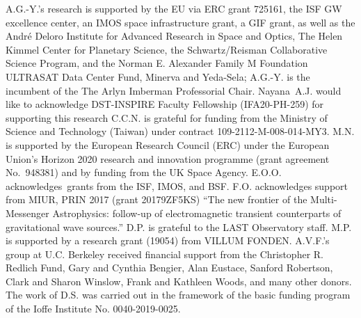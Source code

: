 \documentclass{nature_plusfigure}
\begin{document}
\begin{addendum}
A.G.-Y.’s research is supported by the EU via ERC grant 725161, the ISF GW excellence center, an IMOS space infrastructure grant, a GIF grant, as well as the André Deloro Institute for Advanced Research in Space and Optics, The Helen Kimmel Center for Planetary Science, the Schwartz/Reisman Collaborative Science Program, and the Norman E. Alexander Family M Foundation ULTRASAT Data Center Fund, Minerva and Yeda-Sela;  A.G.-Y. is the incumbent of the The Arlyn Imberman Professorial Chair.
Nayana A.J. would like to acknowledge DST-INSPIRE Faculty Fellowship (IFA20-PH-259) for supporting this research
C.C.N. is grateful for funding from the Ministry of Science and Technology (Taiwan) under contract 109-2112-M-008-014-MY3.
M.N. is supported by the European Research Council (ERC) under the European Union’s Horizon 2020 research and innovation programme (grant agreement No.~948381) and by funding from the UK Space Agency.
E.O.O. acknowledges grants from the ISF, IMOS, and BSF.
F.O. acknowledges support from MIUR, PRIN 2017 (grant 20179ZF5KS) ``The new frontier of the Multi-Messenger Astrophysics: follow-up of electromagnetic transient counterparts of gravitational wave sources.''
D.P. is grateful to the LAST Observatory staff.
M.P. is supported by a research grant (19054) from VILLUM FONDEN.
A.V.F.'s group at U.C. Berkeley received financial support from the Christopher R. Redlich Fund, Gary and Cynthia Bengier, Alan Eustace, Sanford Robertson, Clark and Sharon Winslow, Frank and Kathleen Woods, and many other donors.
The work of D.S. was carried out in the framework of the basic funding
program of the Ioffe Institute No. 0040-2019-0025.



\end{addendum}
\end{document}
